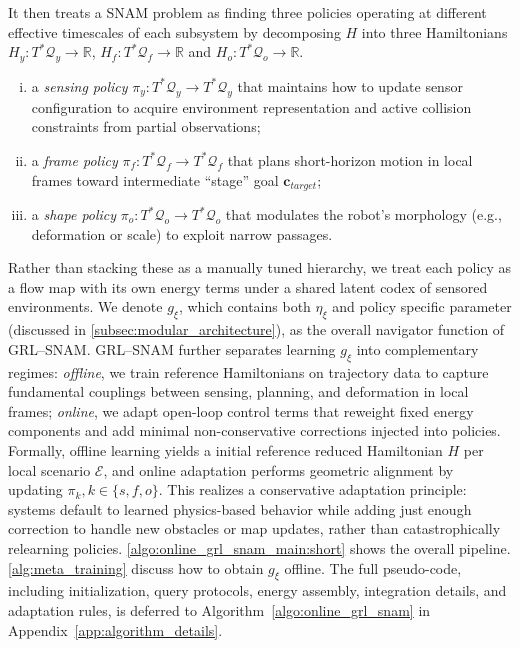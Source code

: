 \documentclass{article} %
\let\vec=\boldsymbol
\begin{document}
It then treats a SNAM problem as finding three policies operating at different effective timescales of each subsystem by decomposing $H$ into three Hamiltonians $H_y:T^{*}\mathcal{Q}_y\rightarrow \mathbb{R}$, $H_f:T^{*}\mathcal{Q}_f\rightarrow \mathbb{R}$ and $H_o:T^{*}\mathcal{Q}_o\rightarrow \mathbb{R}$. 
 \begin{enumerate}[i.)]
     \item a {\emph{sensing policy}} $\pi_y: T^*\mathcal{Q}_y\to T^*
\mathcal{Q}_y$ that maintains how to update sensor configuration to acquire environment representation and active collision constraints from partial observations;
     \item a \emph{frame policy} $\pi_f:  T^*\mathcal{Q}_f\to T^*
\mathcal{Q}_f$ that plans short-horizon motion in local frames toward intermediate “stage” goal $\vec{c}_{target}$;
     \item a \emph{shape policy} $\pi_o: T^*\mathcal{Q}_o\to T^*\mathcal{Q}_o$ that modulates the robot’s morphology (e.g., deformation or scale) to exploit narrow passages.
 \end{enumerate}
 Rather than stacking these as a manually tuned hierarchy, we treat each policy as a flow map with its own energy terms under a shared latent codex of sensored environments. We denote $g_{\xi}$, which contains both $\eta_{\xi}$ and policy specific parameter (discussed in \cref{subsec:modular_architecture}), as the overall navigator function of GRL--SNAM. GRL--SNAM further separates learning $g_{\xi}$ into complementary regimes: \emph{offline}, we train reference Hamiltonians on trajectory data to capture fundamental couplings between sensing, planning, and deformation in local frames;
\emph{online}, we adapt open-loop control terms that reweight fixed energy components and add minimal non-conservative corrections injected into policies. Formally, offline learning yields a initial reference reduced Hamiltonian $H$ per local scenario $\mathcal{E}$, and online adaptation performs geometric alignment by updating $\pi_k,k\in\{s,f,o\}$. This realizes a conservative adaptation principle: systems default to learned physics-based behavior while adding just enough correction to handle new obstacles or map updates, rather than catastrophically relearning policies. \cref{algo:online_grl_snam_main:short} shows the overall pipeline. \cref{alg:meta_training} discuss how to obtain $g_{\xi}$ offline. The full pseudo-code, including initialization, query protocols, energy assembly, integration details, and adaptation rules, is deferred to Algorithm~\ref{algo:online_grl_snam} in Appendix~\ref{app:algorithm_details}.
\end{document}
